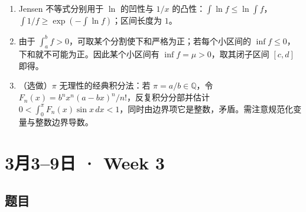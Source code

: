 \documentclass[UTF8,11pt, a4paper, oneside, fontset=none]{ctexbook}
\begin{document}
\begin{enumerate}
\item Jensen 不等式分别用于 $\ln$ 的凹性与 $1/x$ 的凸性：$\int\ln f\le\ln\int f$，$\int 1/f\ge\exp(-\int\ln f)$；区间长度为 $1$。
\item 由于 $\int_a^bf>0$，可取某个分割使下和严格为正；若每个小区间的 $\inf f\le0$，下和就不可能为正。因此某个小区间有 $\inf f=\mu>0$，取其闭子区间 $[c,d]$ 即得。
\item（选做）$\pi$ 无理性的经典积分法：若 $\pi=a/b\in\mathbb Q$，令 $F_n(x)=b^nx^n(a-bx)^n/n!$，反复积分分部并估计 $0<\int_0^\pi F_n(x)\sin x\,dx<1$，同时由边界项它是整数，矛盾。需注意规范化变量与整数边界导数。
\end{enumerate}

\clearpage

\section{3月3--9日 · Week 3}

\subsection*{题目}
\end{document}
